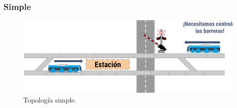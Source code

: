 \subsubsection{Simple}

\lipsum[1]

    \begin{figure}[h]
        \centering
        \includegraphics[width=1\textwidth]{Figuras/simple}
        \centering\caption{Topología simple.}
        \label{fig:simple_1}
    \end{figure}
    
\lipsum[1]